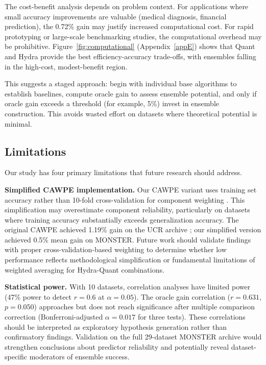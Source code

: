 \documentclass[pdflatex,sn-basic]{sn-jnl}           %
\theoremstyle{thmstyleone}%
\theoremstyle{thmstyletwo}%
\theoremstyle{thmstylethree}%
\begin{document}
The cost-benefit analysis depends on problem context. For applications where small accuracy improvements are valuable (medical diagnosis, financial prediction), the 0.72\% gain may justify increased computational cost. For rapid prototyping or large-scale benchmarking studies, the computational overhead may be prohibitive. Figure~\ref{fig:computational} (Appendix~\ref{appE}) shows that Quant and Hydra provide the best efficiency-accuracy trade-offs, with ensembles falling in the high-cost, modest-benefit region.

This suggests a staged approach: begin with individual base algorithms to establish baselines, compute oracle gain to assess ensemble potential, and only if oracle gain exceeds a threshold (for example, 5\%) invest in ensemble construction. This avoids wasted effort on datasets where theoretical potential is minimal.

\subsection{Limitations}

Our study has four primary limitations that future research should address.

\textbf{Simplified CAWPE implementation.} Our CAWPE variant uses training set accuracy rather than 10-fold cross-validation for component weighting \citep{cawpe}. This simplification may overestimate component reliability, particularly on datasets where training accuracy substantially exceeds generalization accuracy. The original CAWPE achieved 1.19\% gain on the UCR archive \citep[Figure~8]{cawpe}; our simplified version achieved 0.5\% mean gain on MONSTER. Future work should validate findings with proper cross-validation-based weighting to determine whether low performance reflects methodological simplification or fundamental limitations of weighted averaging for Hydra-Quant combinations.

\textbf{Statistical power.} With 10 datasets, correlation analyses have limited power (47\% power to detect $r=0.6$ at $\alpha=0.05$). The oracle gain correlation ($r=0.631$, $p=0.050$) approaches but does not reach significance after multiple comparison correction (Bonferroni-adjusted $\alpha=0.017$ for three tests). These correlations should be interpreted as exploratory hypothesis generation rather than confirmatory findings. Validation on the full 29-dataset MONSTER archive would strengthen conclusions about predictor reliability and potentially reveal dataset-specific moderators of ensemble success.
\end{document}

